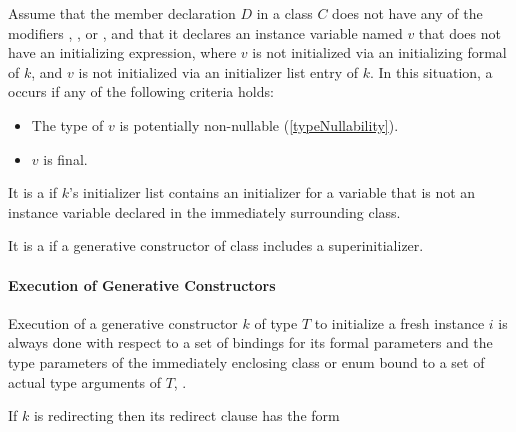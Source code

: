 \documentclass[makeidx]{article}
\begin{document}
\LMHash{}%
%
Assume that the member declaration $D$ in a class $C$
does not have any of the modifiers \LATE, \ABSTRACT, or \EXTERNAL,
and that it declares an instance variable named $v$
that does not have an initializing expression,
where $v$ is not initialized via an initializing formal of $k$,
and $v$ is not initialized via an initializer list entry of $k$.
In this situation,
a  occurs if any of the following criteria holds:

\begin{itemize}
\item The type of $v$ is potentially non-nullable
  (\ref{typeNullability}).
\item $v$ is final.
\end{itemize}

\LMHash{}%
It is a  if $k$'s initializer list contains
an initializer for a variable that is not
an instance variable declared in the immediately surrounding class.


\LMHash{}%
It is a  if a generative constructor of class 
includes a superinitializer.


\paragraph{Execution of Generative Constructors}

\LMHash{}%
%
Execution of a generative constructor $k$ of type $T$
to initialize a fresh instance $i$
is always done with respect to a set of bindings for its formal parameters
and the type parameters of the immediately enclosing class or enum bound to
a set of actual type arguments of $T$, .


\LMHash{}%
If $k$ is redirecting then its redirect clause has the form

\noindent
{}
\end{document}
